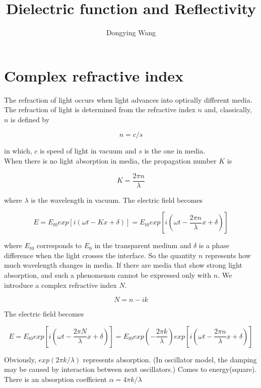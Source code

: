 \documentclass{article}
\author{Dongying Wang}
\title{Dielectric function and Reflectivity}
\begin{document}
	\maketitle
	\section{Complex refractive index}
		The refraction of light occurs when light advances into optically different media. The refraction of light is determined from the refractive index $n$ and, classically, $n$ is defined by

		\begin{equation}
			n = c/s
		\end{equation}

		in which, $c$ is speed of light in vacuum and $s$ is the one in media.\\

		When there is no light absorption in media, the propagation number $K$ is 

		\begin{equation}
			K = \frac{2\pi n}{\lambda}
		\end{equation}

		where $\lambda$ is the wavelength in vacuum. The electric field becomes

		\begin{equation}
			E = E_{t0}exp[i(\omega t - Kx + \delta)] = E_{t0}exp[i(\omega t - \frac{2\pi n}{\lambda}x + \delta)]
		\end{equation}

		where $E_{t0}$ corresponds to $E_{0}$ in the transparent medium and $\delta$ is a phase difference when the light crosses the interface. So the quantity $n$ represents how much wavelength changes in media. If there are media that show strong light absorption, and such a phenomenon cannot be expressed only with $n$. We introduce a complex refractive index $N$.

		\begin{equation}
			N = n - ik
		\end{equation}

		The electric field becomes

		\begin{equation}
			E = E_{t0}exp[i(\omega t - \frac{2\pi N}{\lambda}x + \delta)] = E_{t0}exp(-\frac{2\pi k}{\lambda})exp[i(\omega t - \frac{2\pi n}{\lambda}x + \delta)]
		\end{equation}

		Obviously, $exp(2\pi k/\lambda)$ represents absorption. (In oscillator model, the damping may be caused by interaction between next oscillators.) Comes to energy(square). There is an absorption coefficient $\alpha = 4\pi k/\lambda$
\end{document}
